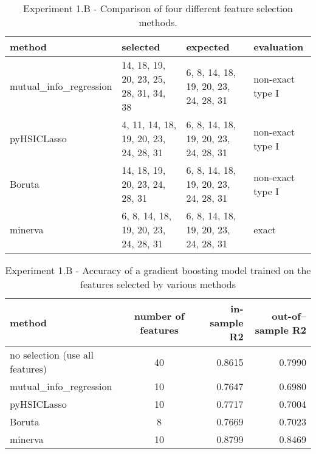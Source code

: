 \begin{table}
	\centering
{
	\begin{tabular}{l|l|l|l}
		\textbf{method}
		&
		\textbf{selected}
		&
		\textbf{expected}
		&
		\textbf{evaluation}
		\\
		\hline
		mutual\_info\_regression
		&
		\tiny{
		14, 18, 19, 20, 23, 25, 28, 31, 34, 38
	}
		& 
		\tiny{
		6, 8, 14, 18, 19, 20, 23, 24, 28, 31
	}
		&
		non-exact type I
		\\
		pyHSICLasso
		&
		\tiny{
		4, 11, 14, 18, 19, 20, 23, 24, 28, 31
	}
		& 
		\tiny{
		6, 8, 14, 18, 19, 20, 23, 24, 28, 31
	}
		&
		non-exact type I
		\\
		Boruta
		&
		\tiny{
		14, 18, 19, 20, 23, 24, 28, 31
	}
		& 
		\tiny{
		6, 8, 14, 18, 19, 20, 23, 24, 28, 31
	}
		&
		non-exact type I
		\\
		minerva
		& 
		\tiny{
		6, 8, 14, 18, 19, 20, 23, 24, 28, 31
	}
		&
		\tiny{
		6, 8, 14, 18, 19, 20, 23, 24, 28, 31
	}
		&
		exact
	\end{tabular}
}
\caption{Experiment 1.B - Comparison of four different feature selection methods.}
\label{tab.experiment1B}
\end{table}


\begin{table}
	\centering
{
	\begin{tabular}{l|c|r|r}
		\textbf{method}
		&
		\textbf{number of features}
		&
		\textbf{in-sample R2}
		&
		\textbf{out-of--sample R2}
		\\
		\hline
		no selection (use all features)
		&
		40
		&
		0.8615
		&
		0.7990
		\\
		mutual\_info\_regression
		&
		10
		&
		0.7647
		& 
		0.6980
		\\
		pyHSICLasso
		&
		10
		& 
		0.7717
		&
		0.7004
		\\
		Boruta
		&
		8
		& 
		0.7669
		&
		0.7023
		\\
		minerva
		& 
		10
		&
		0.8799
		&
		0.8469
	\end{tabular}
}
\caption{Experiment 1.B - Accuracy of a gradient boosting model trained on the features selected by various methods}
\label{tab.experiment1Baccuracy}
\end{table}

